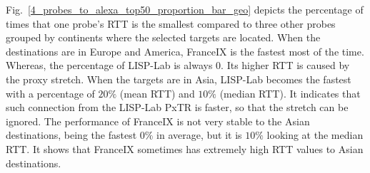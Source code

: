Fig.~\ref{4_probes_to_alexa_top50_proportion_bar_geo} depicts the percentage of times that one probe's RTT is the smallest compared to three other probes grouped by continents where the selected targets are located. When the destinations are in Europe and America, FranceIX is the fastest most of the time. %
Whereas, the percentage of LISP-Lab is always 0. Its higher RTT is caused by the proxy stretch. %
When the targets are in Asia, LISP-Lab becomes the fastest with a percentage of $20\%$ (mean RTT) and $10\%$ (median RTT). It indicates that such connection from the LISP-Lab PxTR is faster, so that the stretch can be ignored. The performance of FranceIX is not very stable to the Asian destinations, being the fastest $0\%$ in average, but it is $10\%$ looking at
the median RTT. It shows that FranceIX sometimes has extremely high RTT values to Asian destinations. 
	
